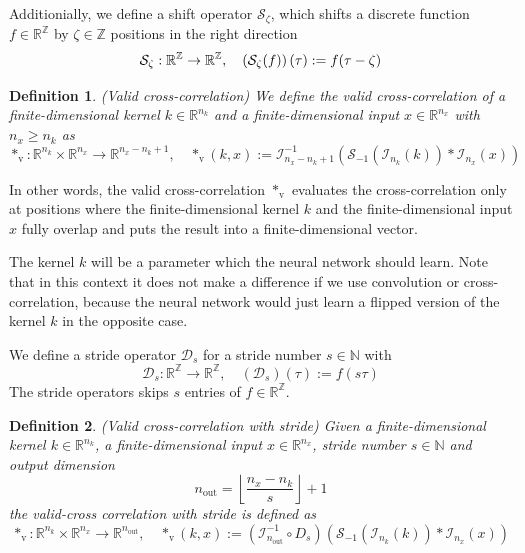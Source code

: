 \documentclass[twoside,a4paper]{article}
\newtheorem{definition}{Definition}
\begin{document}
Additionially, we define a shift operator $\mathcal{S}_\zeta$, 
which shifts a discrete function $f \in \mathbb{R}^\mathbb{Z}$ by $\zeta \in \mathbb{Z}$ positions
in the right direction
\begin{equation*}
	\mathcal{S}_\zeta : \mathbb{R}^{\mathbb{Z}} \to \mathbb{R}^{\mathbb{Z}},
	\quad \left( \mathcal{S}_\zeta(f) \right) (\tau) := f(\tau - \zeta)
\end{equation*}

\begin{definition}\label{def_cross_corr}
	(Valid cross-correlation)
	We define the valid cross-correlation of a finite-dimensional kernel $k \in \mathbb{R}^{n_k}$ and 
	a finite-dimensional input $x \in \mathbb{R}^{n_x}$ with $n_x \geq n_k$ as
	\begin{equation*}
		*_{\text{v}} : \mathbb{R}^{n_k} \times \mathbb{R}^{n_x} \to \mathbb{R}^{n_x-n_k+1},
		\quad *_{\text{v}}(k,x) := \mathcal{I}_{n_x-n_k+1}^{-1} (
			\mathcal{S}_{-1}( \mathcal{I}_{n_k}(k)) * \mathcal{I}_{n_x}(x)
		)
	\end{equation*}
\end{definition}
In other words, the valid cross-correlation $*_{\text{v}}$ evaluates the cross-correlation 
only at positions where the finite-dimensional kernel $k$ and the 
finite-dimensional input $x$ fully overlap and puts the result into a finite-dimensional vector.


The kernel $k$ will be a parameter which the neural network should learn.
Note that in this context it does not make a difference if we use convolution or cross-correlation, because
the neural network would just learn a flipped version of the kernel $k$ in the opposite case.

We define a stride operator $\mathcal{D}_s$ for a stride number $s \in \mathbb{N}$ with
\begin{equation*}
	\mathcal{D}_s : \mathbb{R}^{\mathbb{Z}} \to \mathbb{R}^{\mathbb{Z}},
	\quad (\mathcal{D}_s)(\tau) := f(s \tau)
\end{equation*}
The stride operators skips $s$ entries of $f \in \mathbb{R}^\mathbb{Z}$.

\begin{definition}\label{def_cross_corr_stride}
	(Valid cross-correlation with stride)
	Given a finite-dimensional kernel $k \in \mathbb{R}^{n_k}$, a finite-dimensional
	input $x \in \mathbb{R}^{n_x}$, stride number $s \in \mathbb{N}$ and output dimension
	\begin{equation*}
		n_{\text{out}} = \left\lfloor \frac{n_x - n_k}{s} \right\rfloor + 1
	\end{equation*}
	the valid-cross correlation with stride is defined as
	\begin{equation*}
		*_{\text{v}} : \mathbb{R}^{n_k} \times \mathbb{R}^{n_x} \to \mathbb{R}^{n_{\text{out}}},
		\quad *_{\text{v}}(k,x) := 
		(\mathcal{I}_{n_{\text{out}}}^{-1} \circ D_s)
		(
			\mathcal{S}_{-1}( \mathcal{I}_{n_k}(k)) * \mathcal{I}_{n_x}(x)
		)
	\end{equation*}
\end{definition}
\end{document}
